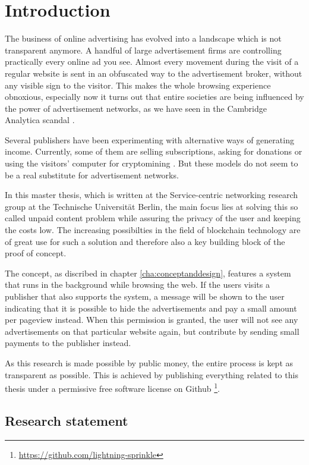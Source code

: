 \chapter{Introduction}
\label{cha:introduction}

The business of online advertising has evolved into a landscape which is not transparent anymore. A handful of large advertisement firms are controlling practically every online ad you see. Almost every movement during the visit of a regular website is sent in an obfuscated way to the advertisement broker, without any visible sign to the visitor. This makes the whole browsing experience obnoxious, especially now it turns out that entire societies are being influenced by the power of advertisement networks, as we have seen in the Cambridge Analytica scandal \cite{FakeWebPage11}.

Several publishers have been experimenting with alternative ways of generating income. Currently, some of them are selling subscriptions, asking for donations or using the visitors' computer for cryptomining \cite{ruth2018digging}. But these models do not seem to be a real substitute for advertisement networks. 

In this master thesis, which is written at the Service-centric networking research group at the Technische Universität Berlin, the main focus lies at solving this so called unpaid content problem while assuring the privacy of the user and keeping the costs low. The increasing possibilties in the field of blockchain technology are of great use for such a solution and therefore also a key building block of the proof of concept.

The concept, as discribed in chapter \ref{cha:conceptanddesign}, features a system that runs in the background while browsing the web. If the users visits a publisher that also supports the system, a message will be shown to the user indicating that it is possible to hide the advertisements and pay a small amount per pageview instead. When this permission is granted, the user will not see any advertisements on that particular website again, but contribute by sending small payments to the publisher instead.

As this research is made possible by public money, the entire process is kept as transparent as possible. This is achieved by publishing everything related to this thesis under a permissive free software license on Github \footnote{\url{https://github.com/lightning-sprinkle}}.

\section{Research statement}

